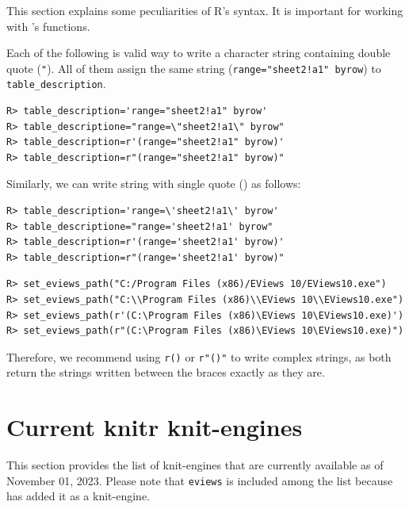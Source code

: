 This section explains some peculiarities of R's syntax. It is important for working with 's functions.

Each of the following is valid way to write a character string containing double quote (\texttt{"}). All of them assign the same string (\texttt{range="sheet2!a1"\ byrow}) to \texttt{table\_description}.

\begin{verbatim}
R> table_description='range="sheet2!a1" byrow'
R> table_descriptione="range=\"sheet2!a1\" byrow"
R> table_description=r'(range="sheet2!a1" byrow)'
R> table_description=r"(range="sheet2!a1" byrow)"
\end{verbatim}

Similarly, we can write string with single quote (\texttt{\textquotesingle{}}) as follows:

\begin{verbatim}
R> table_description='range=\'sheet2!a1\' byrow'
R> table_descriptione="range='sheet2!a1' byrow"
R> table_description=r'(range='sheet2!a1' byrow)'
R> table_description=r"(range='sheet2!a1' byrow)"
\end{verbatim}

\begin{verbatim}
R> set_eviews_path("C:/Program Files (x86)/EViews 10/EViews10.exe")
R> set_eviews_path("C:\\Program Files (x86)\\EViews 10\\EViews10.exe")
R> set_eviews_path(r'(C:\Program Files (x86)\EViews 10\EViews10.exe)')
R> set_eviews_path(r"(C:\Program Files (x86)\EViews 10\EViews10.exe)")
\end{verbatim}

Therefore, we recommend using \texttt{r\textquotesingle{}()\textquotesingle{}} or \texttt{r"()"} to write complex strings, as both return the strings written between the braces exactly as they are.

\hypertarget{current-knitr-knit-engines}{%
\section{Current knitr knit-engines}\label{current-knitr-knit-engines}}

This section provides the list of knit-engines that are currently available as of November 01, 2023. Please note that \texttt{eviews} is included among the list because  has added it as a knit-engine.

